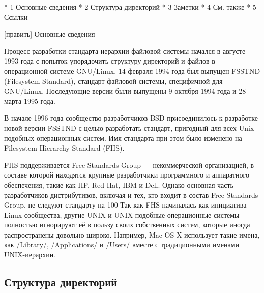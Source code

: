     * 1 Основные сведения
    * 2 Структура директорий
    * 3 Заметки
    * 4 См. также
    * 5 Ссылки

[править] Основные сведения

Процесс разработки стандарта иерархии файловой системы начался в августе 1993 года с попыток упорядочить структуру директорий и файлов в операционной системе GNU/Linux. 14 февраля 1994 года был выпущен FSSTND (Filesystem Standard), стандарт файловой системы, специфичной для GNU/Linux. Последующие версии были выпущены 9 октября 1994 года и 28 марта 1995 года.

В начале 1996 года сообщество разработчиков BSD присоединилось к разработке новой версии FSSTND с целью разработать стандарт, пригодный для всех Unix-подобных операционных систем. Имя стандарта при этом было изменено на Filesystem Hierarchy Standard (FHS).

FHS поддерживается Free Standards Group — некоммерческой организацией, в составе которой находятся крупные разработчики программного и аппаратного обеспечения, такие как HP, Red Hat, IBM и Dell. Однако основная часть разработчиков дистрибутивов, включая и тех, кто входит в состав Free Standards Group, не следуют стандарту на 100 %
Так как FHS начиналась как инициатива Linux-сообщества, другие UNIX и UNIX-подобные операционные системы полностью игнорируют её в пользу своих собственных систем, которые иногда распространены довольно широко. Например, Mac OS X использует такие имена, как /Library/, /Applications/ и /Users/ вместе с традиционными именами UNIX-иерархии.
\subsection{Структура директорий}


